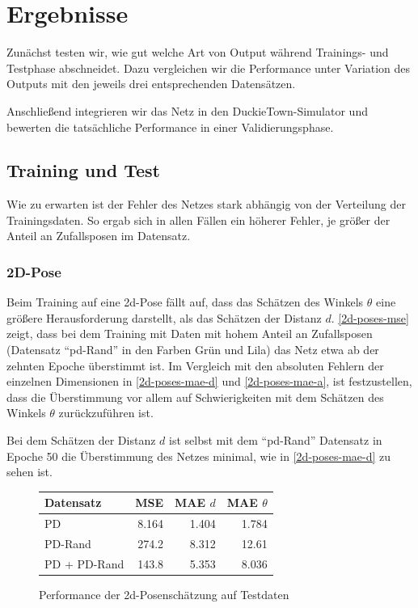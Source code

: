 \chapter{Ergebnisse}

Zunächst testen wir, wie gut welche Art von Output während Trainings- und Testphase abschneidet. Dazu vergleichen wir die Performance unter Variation des Outputs mit den jeweils drei entsprechenden Datensätzen. 

Anschließend integrieren wir das Netz in den DuckieTown-Simulator und bewerten die tatsächliche Performance in einer Validierungsphase.

\section{Training und Test}

Wie zu erwarten ist der Fehler des Netzes stark abhängig von der Verteilung der Trainingsdaten. So ergab sich in allen Fällen ein höherer Fehler, je größer der Anteil an Zufallsposen im Datensatz. 

\subsection{2D-Pose}

Beim Training auf eine \acs{2d}-Pose fällt auf, dass das Schätzen des Winkels $\theta$ eine größere Herausforderung darstellt, als das Schätzen der Distanz $d$. \ref{2d-poses-mse} zeigt, dass bei dem Training mit Daten mit hohem Anteil an Zufallsposen (Datensatz ``\acs{pd}-Rand'' in den Farben Grün und Lila) das Netz etwa ab der zehnten Epoche überstimmt ist. Im Vergleich mit den absoluten Fehlern der einzelnen Dimensionen in \ref{2d-poses-mae-d} und \ref{2d-poses-mae-a}, ist festzustellen, dass die Überstimmung vor allem auf Schwierigkeiten mit dem Schätzen des Winkels $\theta$ zurückzuführen ist.

Bei dem Schätzen der Distanz $d$ ist selbst mit dem ``\acs{pd}-Rand'' Datensatz in Epoche 50 die Überstimmung des Netzes minimal, wie in \ref{2d-poses-mae-d} zu sehen ist.


\begin{figure}[H]
	\centering
		\begin{tabular}[t]{|l|r|r|r|}
			\hline
			Datensatz & MSE & MAE $d$ & MAE $\theta$ \\
			\hline
			PD & 8.164 & 1.404 & 1.784 \\
			\hline
			PD-Rand & 274.2 & 8.312 & 12.61 \\
			\hline
			PD + PD-Rand & 143.8 & 5.353 & 8.036 \\
			\hline
		\end{tabular}
	\caption{Performance der \acs{2d}-Posenschätzung auf Testdaten}
	\label{2d-pose-performance}
\end{figure}

